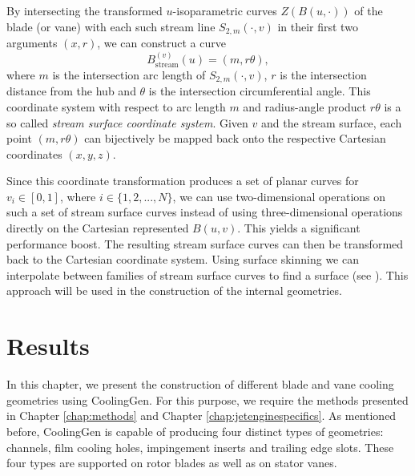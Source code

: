 \documentclass[a4paper, 11pt]{report}
\theoremstyle{definition}
\renewcommand{\emph}[1]{\textit{#1}}
\begin{document}
	By intersecting the transformed $u$-isoparametric curves $Z(B(u,\cdot))$ of the blade (or vane) with each such stream line $S_{2,m}(\cdot, v)$ in their first two arguments $(x,r)$, we can construct a curve
		$$ B^{(v)}_\textrm{stream}(u) = (m, r\theta),$$
	where $m$ is the intersection arc length of $S_{2,m}(\cdot, v)$, $r$ is the intersection distance from the hub and $\theta$ is the intersection circumferential angle. This coordinate system with respect to arc length $m$ and radius-angle product $r\theta$ is a so called \emph{stream surface coordinate system}. Given $v$ and the stream surface, each point $(m, r\theta)$ can bijectively be mapped back onto the respective Cartesian coordinates $(x, y, z)$.

	Since this coordinate transformation produces a set of planar curves for $v_i \in [0,1]$, where $i \in \{1, 2, ..., N\}$, we can use two-dimensional operations on such a set of stream surface curves instead of using three-dimensional operations directly on the Cartesian represented $B(u,v)$. This yields a significant performance boost. The resulting stream surface curves can then be transformed back to the Cartesian coordinate system. Using surface skinning we can interpolate between families of stream surface curves to find a surface (see \cite{Piegl1997}). This approach will be used in the construction of the internal geometries.

\chapter{Results}\label{chap:results}
	In this chapter, we present the construction of different blade and vane cooling geometries using CoolingGen. For this purpose, we require the methods presented in Chapter \ref{chap:methods} and Chapter \ref{chap:jetenginespecifics}. As mentioned before, CoolingGen is capable of producing four distinct types of geometries: channels, film cooling holes, impingement inserts and trailing edge slots. These four types are supported on rotor blades as well as on stator vanes.
 	
\end{document}
